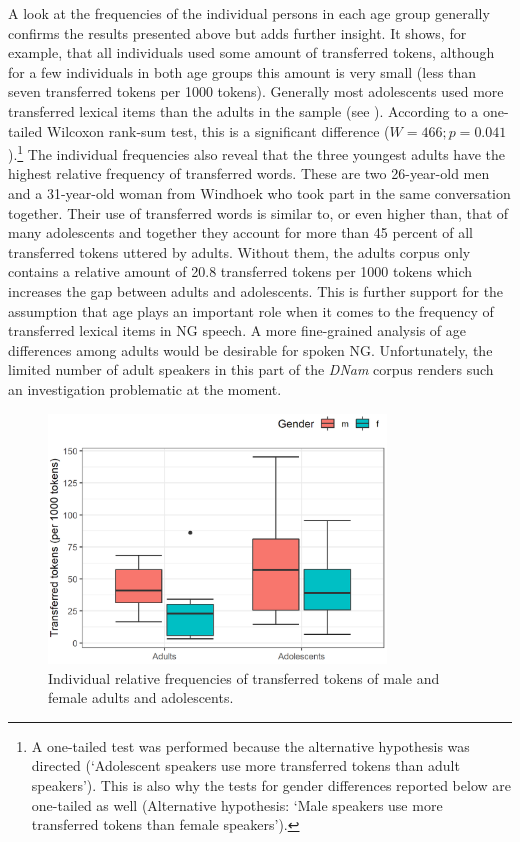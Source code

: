 \documentclass[output=paper]{langsci/langscibook}
\begin{document}
A look at the frequencies of the individual persons in each age group generally confirms the results presented above but adds further insight. It shows, for example, that all individuals used some amount of transferred tokens, although for a few individuals in both age groups this amount is very small (less than seven transferred tokens per 1000 tokens). Generally most adolescents used more transferred lexical items than the adults in the sample (see ). According to a one-tailed Wilcoxon rank-sum test, this is a significant difference ($W = 466; p = 0.041$).\footnote{A one-tailed test was performed because the alternative hypothesis was directed (‘Adolescent speakers use more transferred tokens than adult speakers’). This is also why the tests for gender differences reported below are one-tailed as well (Alternative hypothesis: ‘Male speakers use more transferred tokens than female speakers’).} The individual frequencies also reveal that the three youngest adults have the highest relative frequency of transferred words. These are two 26-year-old men and a 31-year-old woman from Windhoek who took part in the same conversation together. Their use of transferred words is similar to, or even higher than, that of many adolescents and together they account for more than 45 percent of all transferred tokens uttered by adults. Without them, the adults corpus only contains a relative amount of 20.8 transferred tokens per 1000 tokens which increases the gap between adults and adolescents. This is further support for the assumption that age plays an important role when it comes to the frequency of transferred lexical items in NG speech. A more fine-grained analysis of age differences among adults would be desirable for spoken NG. Unfortunately, the limited number of adult speakers in this part of the \textit{DNam} corpus renders such an investigation problematic at the moment.

\begin{figure}
\includegraphics[width=0.8\textwidth]{figures/brackefig1.png}
\caption{Individual relative frequencies of transferred tokens of male and female adults and adolescents.\label{fig:bracke:1}}
\end{figure}
\end{document}
